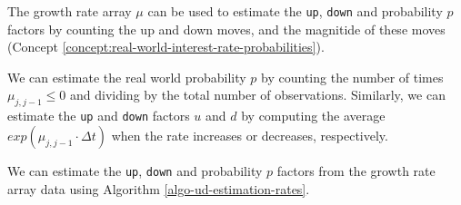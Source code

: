 \documentclass[11pt]{article}
\theoremstyle{definition}
\begin{document}
The growth rate array $\mu$ can be used to estimate the \texttt{up}, \texttt{down} and probability $p$ factors by counting the up and down moves, 
and the magnitide of these moves (Concept \ref{concept:real-world-interest-rate-probabilities}).
\begin{concept}\label{concept:real-world-interest-rate-probabilities}
We can estimate the real world probability $p$ by counting the number of times $\mu_{j,j-1}\leq{0}$ and 
dividing by the total number of observations. Similarly, we can estimate the \texttt{up} and \texttt{down} factors $u$ and $d$ 
by computing the average $exp(\mu_{j,j-1}\cdot{\Delta{t}})$ when the rate increases or decreases, respectively.
\end{concept}
We can estimate the \texttt{up}, \texttt{down} and probability $p$ factors from the growth rate array data 
using Algorithm \ref{algo-ud-estimation-rates}. 
\end{document}
